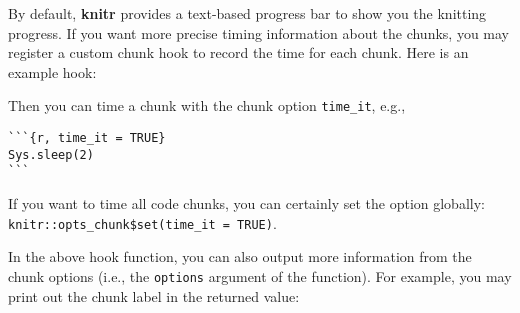 \documentclass[
  11pt,
]{krantz}
\newenvironment{Shaded}{\begin{snugshade}}{\end{snugshade}}
\newcommand{\CommentTok}[1]{\textcolor[rgb]{0.37,0.37,0.37}{\textit{#1}}}
\newcommand{\ControlFlowTok}[1]{\textcolor[rgb]{0.27,0.27,0.27}{\textbf{#1}}}
\newcommand{\DataTypeTok}[1]{\textcolor[rgb]{0.27,0.27,0.27}{#1}}
\newcommand{\KeywordTok}[1]{\textcolor[rgb]{0.27,0.27,0.27}{\textbf{#1}}}
\newcommand{\NormalTok}[1]{#1}
\newcommand{\OperatorTok}[1]{\textcolor[rgb]{0.43,0.43,0.43}{\textbf{#1}}}
\newcommand{\OtherTok}[1]{\textcolor[rgb]{0.37,0.37,0.37}{#1}}
\newcommand{\StringTok}[1]{\textcolor[rgb]{0.5,0.5,0.5}{#1}}
\begin{document}
By default, \textbf{knitr} provides a text-based progress bar to show you the knitting progress. If you want more precise timing information about the chunks, you may register a custom chunk hook to record the time for each chunk. Here is an example hook:

\begin{Shaded}
\end{Shaded}

Then you can time a chunk with the chunk option \texttt{time\_it}, e.g.,

\begin{verbatim}
```{r, time_it = TRUE}
Sys.sleep(2)
```
\end{verbatim}

If you want to time all code chunks, you can certainly set the option globally: \texttt{knitr::opts\_chunk\$set(time\_it\ =\ TRUE)}.

In the above hook function, you can also output more information from the chunk options (i.e., the \texttt{options} argument of the function). For example, you may print out the chunk label in the returned value:

\begin{Shaded}
\end{Shaded}
\end{document}
